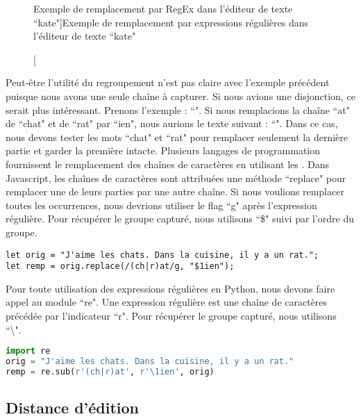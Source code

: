 \documentclass{KodeBook}
\begin{document}
\begin{figure}[ht]
	\centering
	\caption[Exemple de remplacement par RegEx dans l'éditeur de texte ``kate"]{Exemple de remplacement par expressions régulières dans l'éditeur de texte ``kate" \label{fig:kate_regex}}
\end{figure}


Peut-être l'utilité du regroupement n'est pas claire avec l'exemple précédent puisque nous avons une seule chaîne à capturer.
Si nous avions une disjonction, ce serait plus intéressant.
Prenons l'exemple : ``". 
Si nous remplacions la chaîne ``at" de ``chat" et de ``rat" par ``ien", nous aurions le texte suivant : 
``".
Dans ce cas, nous devons tester les mots ``chat" et ``rat" pour remplacer seulement la dernière partie et garder la première intacte.
Plusieurs langages de programmation fournissent le remplacement des chaînes de caractères en utilisant les .
Dans Javascript, les chaînes de caractères sont attribuées une méthode ``replace" pour remplacer une de leurs parties par une autre chaîne. 
Si nous voulions remplacer toutes les occurrences, nous devrions utiliser le flag ``g" après l'expression régulière.
Pour récupérer le groupe capturé, nous utilisons ``\$" suivi par l'ordre du groupe.

\begin{lstlisting}[language={[KB]Javascript}, style=codeStyle]
let orig = "J'aime les chats. Dans la cuisine, il y a un rat.";
let remp = orig.replace(/(ch|r)at/g, "$1ien");
\end{lstlisting}

Pour toute utilisation des expressions régulières en Python, nous devons faire appel au module ``re".
Une expression régulière est une chaîne de caractères précédée par l'indicateur ``r".
Pour récupérer le groupe capturé, nous utilisons ``\textbackslash".

\begin{lstlisting}[language=Python, style=codeStyle]
import re
orig = "J'aime les chats. Dans la cuisine, il y a un rat."
remp = re.sub(r'(ch|r)at', r'\1ien', orig)
\end{lstlisting}


\subsection{Distance d'édition}
\end{document}
